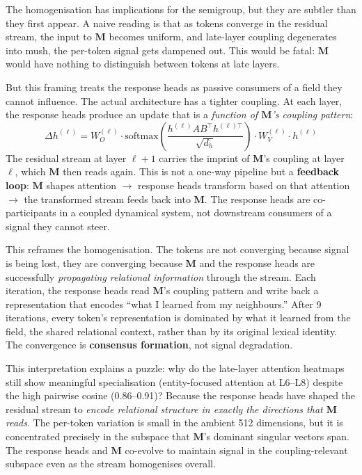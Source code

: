 \documentclass[11pt, a4paper]{article}
\newcommand{\M}{\mathbf{M}}
\theoremstyle{plain}
\theoremstyle{remark}
\begin{document}
The homogenisation has implications for the semigroup, but they are subtler than they first appear.
A naive reading is that as tokens converge in the residual stream, the input to $\M$ becomes uniform, and late-layer coupling degenerates into mush, the per-token signal gets dampened out.
This would be fatal: $\M$ would have nothing to distinguish between tokens at late layers.

But this framing treats the response heads as passive consumers of a field they cannot influence.
The actual architecture has a tighter coupling.
At each layer, the response heads produce an update that is a \emph{function of $\M$'s coupling pattern}:
\begin{equation}
    \Delta h^{(\ell)} = W_O^{(\ell)} \cdot \text{softmax}\!\left(\frac{h^{(\ell)} A B^\top h^{(\ell)\top}}{\sqrt{d_h}}\right) \cdot W_V^{(\ell)} \cdot h^{(\ell)}
\end{equation}
The residual stream at layer $\ell{+}1$ carries the imprint of $\M$'s coupling at layer $\ell$, which $\M$ then reads again.
This is not a one-way pipeline but a \textbf{feedback loop}: $\M$ shapes attention $\to$ response heads transform based on that attention $\to$ the transformed stream feeds back into $\M$.
The response heads are co-participants in a coupled dynamical system, not downstream consumers of a signal they cannot steer.

This reframes the homogenisation.
The tokens are not converging because signal is being lost, they are converging because $\M$ and the response heads are successfully \emph{propagating relational information} through the stream.
Each iteration, the response heads read $\M$'s coupling pattern and write back a representation that encodes ``what I learned from my neighbours.''
After 9 iterations, every token's representation is dominated by what it learned from the field, the shared relational context, rather than by its original lexical identity.
The convergence is \textbf{consensus formation}, not signal degradation.

This interpretation explains a puzzle: why do the late-layer attention heatmaps still show meaningful specialisation (entity-focused attention at L6--L8) despite the high pairwise cosine (0.86--0.91)?
Because the response heads have shaped the residual stream to \emph{encode relational structure in exactly the directions that $\M$ reads}.
The per-token variation is small in the ambient 512 dimensions, but it is concentrated precisely in the subspace that $\M$'s dominant singular vectors span.
The response heads and $\M$ co-evolve to maintain signal in the coupling-relevant subspace even as the stream homogenises overall.
\end{document}
